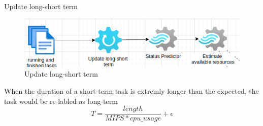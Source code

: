 \documentclass[10pt,xcolor={dvipsnames}, aspectratio=169]{beamer}
\begin{document}
\begin{frame}
{Update long-short term}
	\begin{figure}
		\centering
		\includegraphics[scale=0.5]{images/status_estimation.png}
		\caption{Update long-short term}
	\end{figure}
	
	\begin{block}
	{When the duration of a short-term task is extremly longer than the expected, the task would be re-labled as long-term}
		\begin{equation*}
			T = \frac{length}{MIPS * cpu\_usage} + \epsilon
		\end{equation*}
	\end{block}
\end{frame}
\end{document}
